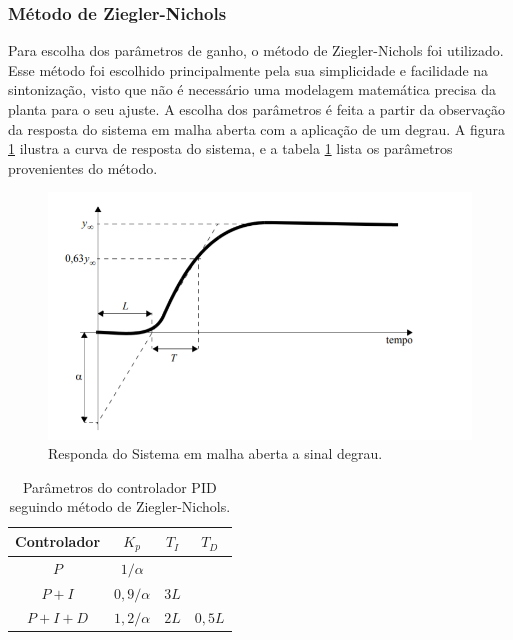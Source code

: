 \subsubsection{Método de Ziegler-Nichols}


Para escolha dos parâmetros de ganho, o método de Ziegler-Nichols foi utilizado. Esse método foi escolhido principalmente pela sua simplicidade e facilidade na sintonização, visto que não é necessário uma modelagem matemática precisa da planta para o seu ajuste. 
A escolha dos parâmetros é feita a partir da observação da resposta do sistema em malha aberta com a aplicação de um degrau. A figura \ref{fig:resposta_sistema} ilustra a curva de resposta do sistema, e a tabela \ref{tab:parametros_ziegler} lista os parâmetros provenientes do método.


\begin{figure}[h]
    \centering
    \includegraphics[scale=0.45]{figuras/implementacao/hardware/resposta.png}
    \caption{Responda do Sistema em malha aberta a sinal degrau.}
    \label{fig:resposta_sistema}
\end{figure}

\begin{table}[H]
    \begin{center}
        \begin{tabular}{ |c|c|c|c| } 
            \hline
            Controlador & \(K_p\) & \(T_I\) & \(T_D\) \\
            \hline
            \(P\) & \(1/\alpha\) &  & \\
            \hline
            \(P + I\) & \(0,9/\alpha\) & \(3L\) & \\
            \hline
            \(P + I + D\) & \(1,2/\alpha\) & \(2L\) & \(0,5L\) \\
            \hline
        \end{tabular}
        \caption{\label{tab:parametros_ziegler} Parâmetros do controlador PID seguindo método de Ziegler-Nichols.}
    \end{center}
\end{table}


